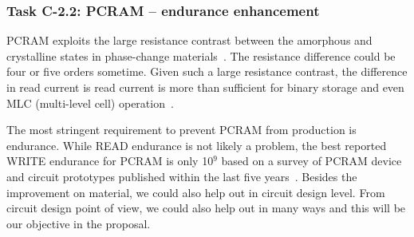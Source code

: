 \subsubsection{Task C-2.2: PCRAM -- endurance enhancement}

PCRAM exploits the large resistance contrast between the amorphous and crystalline states in phase-change materials~\cite{Raoux08}. The resistance difference could be four or five orders sometime. Given such a large resistance contrast, the difference in read current is read current is more than sufficient for binary storage and even MLC (multi-level cell) operation~\cite{Raoux08}.

The most stringent requirement to prevent PCRAM from production is endurance. While READ endurance is not likely a problem, the best reported WRITE endurance for PCRAM is only 10$^9$ based on a survey of PCRAM device and circuit prototypes published within the last five years~\cite{Lee09}. Besides the improvement on material, we could also help out in circuit design level. From circuit design point of view, we could also help out in many ways and this will be our objective in the proposal.

